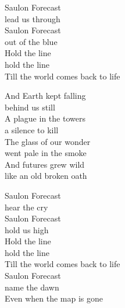\begin{lyrics}
Saulon Forecast\\
lead us through\\
Saulon Forecast\\
out of the blue\\
Hold the line\\
hold the line\\
Till the world comes back to life

And Earth kept falling\\
behind us still\\
A plague in the towers\\
a silence to kill\\
The glass of our wonder\\
went pale in the smoke\\
And futures grew wild\\
like an old broken oath

Saulon Forecast\\
hear the cry\\
Saulon Forecast\\
hold us high\\
Hold the line\\
hold the line\\
Till the world comes back to life\\
Saulon Forecast\\
name the dawn\\
Even when the map is gone
\end{lyrics}

